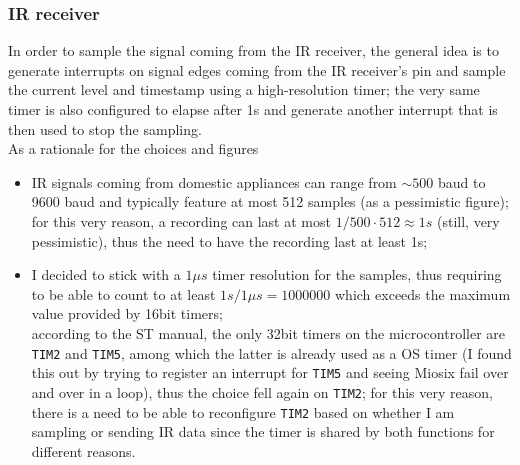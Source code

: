 \documentclass[10pt,a4]{article}
\begin{document}
\subsubsection{IR receiver}
In order to sample the signal coming from the IR receiver, the general idea is to generate interrupts on signal edges coming from the IR receiver's pin and sample the current level and timestamp using a high-resolution timer; the very same timer is also configured to elapse after 1s and generate another interrupt that is then used to stop the sampling.\\
As a rationale for the choices and figures
\begin{itemize}
\item IR signals coming from domestic appliances can range from $\sim500$ baud to 9600 baud and typically feature at most 512 samples (as a pessimistic figure); for this very reason, a recording can last at most $1 / 500 \cdot 512 \approx 1s $ (still, very pessimistic), thus the need to have the recording last at least 1s;\\
\item I decided to stick with a $1\mu s$ timer resolution for the samples, thus requiring to be able to count to at least $1s / 1\mu s = 1000000$ which exceeds the maximum value provided by 16bit timers;\\ according to the ST manual, the only 32bit timers on the microcontroller are \texttt{TIM2} and \texttt{TIM5}, among which the latter is already used as a OS timer (I found this out by trying to register an interrupt for \texttt{TIM5} and seeing Miosix fail over and over in a loop), thus the choice fell again on \texttt{TIM2}; for this very reason, there is a need to be able to reconfigure \texttt{TIM2} based on whether I am sampling or sending IR data since the timer is shared by both functions for different reasons.
\end{itemize}
\end{document}

